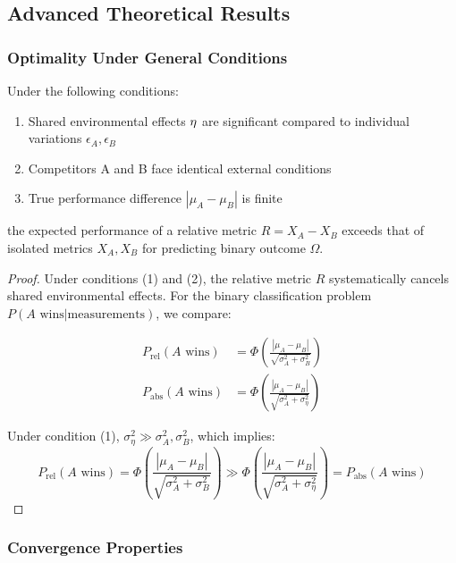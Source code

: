 \subsection{Advanced Theoretical Results}

\subsubsection{Optimality Under General Conditions}

\begin{theorem}
\label{thm:relative_superiority}
Under the following conditions:
\begin{enumerate}
\item Shared environmental effects $\eta$ are significant compared to individual variations $\epsilon_A, \epsilon_B$
\item Competitors A and B face identical external conditions
\item True performance difference $|\mu_A - \mu_B|$ is finite
\end{enumerate}
the expected performance of a relative metric $R = X_A - X_B$ exceeds that of isolated metrics $X_A, X_B$ for predicting binary outcome $\Omega$.
\end{theorem}

\begin{proof}
Under conditions (1) and (2), the relative metric $R$ systematically cancels shared environmental effects. For the binary classification problem $P(A \text{ wins} | \text{measurements})$, we compare:

\begin{align}
P_{\text{rel}}(A \text{ wins}) &= \Phi\left(\frac{|\mu_A - \mu_B|}{\sqrt{\sigma_A^2 + \sigma_B^2}}\right) \\
P_{\text{abs}}(A \text{ wins}) &= \Phi\left(\frac{|\mu_A - \mu_B|}{\sqrt{\sigma_A^2 + \sigma_\eta^2}}\right)
\end{align}

Under condition (1), $\sigma_\eta^2 \gg \sigma_A^2, \sigma_B^2$, which implies:
\begin{equation}
P_{\text{rel}}(A \text{ wins}) = \Phi\left(\frac{|\mu_A - \mu_B|}{\sqrt{\sigma_A^2 + \sigma_B^2}}\right) \gg \Phi\left(\frac{|\mu_A - \mu_B|}{\sqrt{\sigma_A^2 + \sigma_\eta^2}}\right) = P_{\text{abs}}(A \text{ wins})
\end{equation}
\end{proof}

\subsubsection{Convergence Properties}

